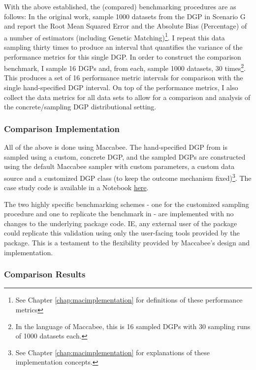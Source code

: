\documentclass[../main.tex]{subfiles}
\begin{document}
With the above established, the (compared) benchmarking procedures are as follows: In the original work, \citeauthor{Diamond2013GeneticStudies} sample 1000 datasets from the DGP in Scenario G and report the Root Mean Squared Error and the Absolute Bias (Percentage) of a number of estimators (including Genetic Matching)\footnote{See Chapter \ref{chap:macimplementation} for definitions of these performance metrics}. I repeat this data sampling thirty times to produce an interval that quantifies the variance of the performance metrics for this single DGP. In order to construct the comparison benchmark, I sample 16 DGPs and, from each, sample 1000 datasets, 30 times\footnote{In the language of Maccabee, this is 16 sampled DGPs with 30 sampling runs of 1000 datasets each.}. This produces a set of 16 performance metric intervals for comparison with the single hand-specified DGP interval. On top of the performance metrics, I also collect the data metrics for all data sets to allow for a comparison and analysis of the concrete/sampling DGP distributional setting.

\subsubsection{Comparison Implementation}

All of the above is done using Maccabee. The hand-specified DGP from \textcite{Diamond2013GeneticStudies} is sampled using a custom, concrete DGP, and the sampled DGPs are constructed using the default Maccabee sampler with custom parameters, a custom data source and a customized DGP class (to keep the outcome mechanism fixed)\footnote{See Chapter \ref{chap:macimplementation} for explanations of these implementation concepts.}. The case study code is available in a Notebook \href{https://github.com/JoshBroomberg/Maccabee/blob/master/Notebooks/Genmatch\%20Benchmarking\%20Validation.ipynb}{here}. 

\vspace{\baselineskip}

The two highly specific benchmarking schemes - one for the customized sampling procedure and one to replicate the benchmark in \textcite{Diamond2013GeneticStudies} - are implemented with no changes to the underlying package code. IE, any external user of the package could replicate this validation using only the user-facing tools provided by the package. This is a testament to the flexibility provided by Maccabee's design and implementation.

\subsubsection{Comparison Results}
\end{document}
